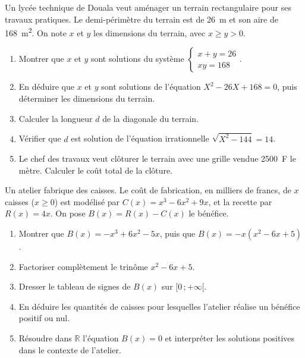 \documentclass[11pt]{article}
\begin{document}
\begin{exercice}
Un lycée technique de Douala veut aménager un terrain rectangulaire pour ses travaux pratiques. Le demi-périmètre du terrain est de \SI{26}{m} et son aire de \SI{168}{m^2}. On note $x$ et $y$ les dimensions du terrain, avec $x \geq y > 0$.
\begin{enumerate}
\item Montrer que $x$ et $y$ sont solutions du système $\begin{cases} x + y = 26 \\ xy = 168 \end{cases}$.
\item En déduire que $x$ et $y$ sont solutions de l'équation $X^2 - 26X + 168 = 0$, puis déterminer les dimensions du terrain.
\item Calculer la longueur $d$ de la diagonale du terrain.
\item Vérifier que $d$ est solution de l'équation irrationnelle $\sqrt{X^2 - 144} = 14$.
\item Le chef des travaux veut clôturer le terrain avec une grille vendue \SI{2500}{F} le mètre. Calculer le coût total de la clôture.
\end{enumerate}
\end{exercice}

\begin{exercice}
Un atelier fabrique des caisses. Le coût de fabrication, en milliers de francs, de $x$ caisses ($x \geq 0$) est modélisé par $C(x) = x^3 - 6x^2 + 9x$, et la recette par $R(x) = 4x$. On pose $B(x) = R(x) - C(x)$ le bénéfice.
\begin{enumerate}
\item Montrer que $B(x) = -x^3 + 6x^2 - 5x$, puis que $B(x) = -x(x^2 - 6x + 5)$.
\item Factoriser complètement le trinôme $x^2 - 6x + 5$.
\item Dresser le tableau de signes de $B(x)$ sur $[0\,;+\infty[$.
\item En déduire les quantités de caisses pour lesquelles l'atelier réalise un bénéfice positif ou nul.
\item Résoudre dans $\mathbb{R}$ l'équation $B(x) = 0$ et interpréter les solutions positives dans le contexte de l'atelier.
\end{enumerate}
\end{exercice}
\end{document}
